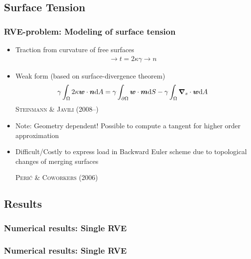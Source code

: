 \documentclass[11pt,mathserif]{beamer}
\newcommand{\roughcite}[1]{\textsc{#1}}
\begin{document}
\subsection{Surface Tension}
\begin{frame}
 \frametitle{RVE-problem: Modeling of surface tension}
 \begin{itemize}
  \item Traction from curvature of free surfaces
 \begin{gather*}
  \to t = 2\kappa\gamma \to n
\end{gather*}
 \item Weak form (based on surface-divergence theorem)
\begin{gather*}
 \gamma\int_\Omega 2 \kappa \text{\boldmath $w$}\cdot \text{\boldmath $n$}\mathrm{d}A = \gamma\int_{\partial\Omega} \text{\boldmath $w$}\cdot\text{\boldmath $m$}\mathrm{d}S - \gamma\int_\Omega \text{\boldmath $\nabla$}_s \cdot \text{\boldmath $w$} \mathrm{d}A
 \label{eq:curvature}
\end{gather*}
 \roughcite{Steinmann \& Javili (2008--)}
 \item \alert{Note: Geometry dependent!} Possible to compute a tangent for higher order approximation

 \item Difficult/Costly to express load in Backward Euler scheme due to topological changes of merging surfaces

 \roughcite{Perić \& Coworkers (2006)}
 \end{itemize}
\end{frame}

\subsection{Results}
\begin{frame}
 \frametitle{Numerical results: Single RVE}
\begin{center}

\end{center}
\end{frame}

\begin{frame}
 \frametitle{Numerical results: Single RVE}
\begin{center}

\end{center}
\end{frame}
\end{document}
